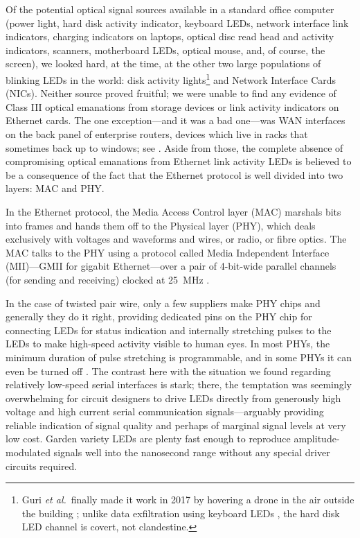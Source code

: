 \documentclass[conference]{IEEEtran}
\begin{document}
Of the potential optical signal sources available in a standard office
computer (power light, hard disk activity indicator, keyboard LEDs, network
interface link indicators, charging indicators on laptops, optical disc read
head and activity indicators, scanners, motherboard LEDs, optical mouse, and,
of course, the screen), we
looked hard, at the time, at the other two large populations of blinking
LEDs in the world: disk activity lights\footnote{Guri {\it et al.}\ finally
made it work in 2017 by hovering a drone in the air outside the building
\cite{Guri2017a}; unlike data exfiltration using keyboard LEDs
\cite[Chapter 90]{Stephenson1999}, the hard disk LED channel is covert, not
clandestine.} and Network Interface Cards (NICs).
Neither source proved fruitful; we were unable to find any evidence of Class
III optical emanations from storage devices or link activity indicators on
Ethernet cards. The one exception---and it was a bad one---was WAN interfaces
on the back panel of enterprise routers, devices which live in racks that
sometimes back up to windows; see \cite[\S 4.3.1]{Loughry2002a}. Aside from
those, the complete absence of compromising optical emanations from Ethernet
link activity LEDs is believed to be a consequence of the fact that the
Ethernet protocol is well divided into two layers: MAC and PHY.

In the Ethernet protocol, the Media Access Control layer (MAC) marshals bits
into frames and hands them off to the Physical layer (PHY), which deals
exclusively with voltages and waveforms and wires, or radio, or fibre
optics. The MAC talks to the PHY using a protocol called Media Independent
Interface (MII)---GMII for gigabit Ethernet---over a pair of 4-bit-wide
parallel channels (for sending and receiving) clocked at \SI{25}{\mega\hertz}
\cite{TI2009a}.

In the case of twisted pair wire, only a few suppliers make PHY chips and
generally they do it right, providing dedicated pins on the PHY chip for
connecting LEDs for status indication and internally stretching pulses to the
LEDs to make high-speed activity visible to human eyes. In most PHYs, the
minimum duration of pulse stretching is programmable, and in some PHYs it can
even be turned off \cite[Table 39]{Intel2011a}. The contrast here with the
situation we found regarding relatively low-speed serial interfaces is stark;
there, the temptation was seemingly overwhelming for circuit designers to
drive LEDs directly from generously high voltage and high current serial
communication signals---arguably providing reliable indication of signal
quality and perhaps of marginal signal levels at very low cost. Garden
variety LEDs are plenty fast enough to reproduce amplitude-modulated signals
well into the nanosecond range without any special driver circuits required.
\end{document}
